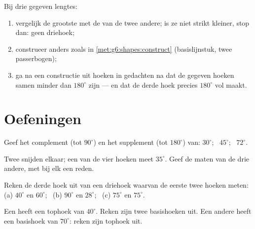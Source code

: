 \begin{method}\label{met:g7:triangles:construct}
Bij drie gegeven lengtes:
\begin{enumerate}
  \item vergelijk de grootste met de  van de twee andere; is ze niet strikt
        kleiner, stop dan: geen driehoek;
  \item construeer anders zoals in \cref{met:g6:shapes:construct} (basislijnstuk,
        twee passerbogen);
  \item ga na een constructie uit hoeken in gedachten na dat de gegeven hoeken
        samen minder dan $180^\circ$ zijn --- en dat de derde hoek precies
        $180^\circ$ vol maakt.
\end{enumerate}
\end{method}

\section{Oefeningen}

\begin{exercise}[$\star$]\label{exo:g7:triangles:1}
Geef het complement (tot $90^\circ$) en het supplement (tot $180^\circ$) van:
$30^\circ$; \ $45^\circ$; \ $72^\circ$.
\end{exercise}

\begin{exercise}[$\star$]\label{exo:g7:triangles:2}
Twee  snijden elkaar; een van de vier hoeken meet $35^\circ$. Geef de maten
van de drie andere, met bij elk een reden.
\end{exercise}

\begin{exercise}[$\star$]\label{exo:g7:triangles:3}
Reken de derde hoek uit van een driehoek waarvan de eerste twee hoeken meten:
(a) $40^\circ$ en $60^\circ$; \
(b) $90^\circ$ en $28^\circ$; \
(c) $75^\circ$ en $75^\circ$.
\end{exercise}

\begin{exercise}[$\star$]\label{exo:g7:triangles:4}
Een  heeft een tophoek van $40^\circ$. Reken zijn twee
basishoeken uit. Een andere  heeft een basishoek van
$70^\circ$: reken zijn tophoek uit.
\end{exercise}

